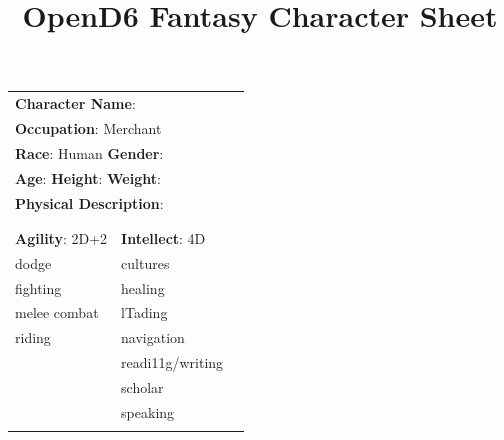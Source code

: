 \documentclass[10pt]{article}
\title{OpenD6 Fantasy Character Sheet}
\begin{document}
\pagestyle{fancy}
\fancyhf{}
\fancyfoot[R]{\thepage}
\renewcommand{\headrulewidth}{0pt}


\cleardoublepage
\begin{table}
\begin{tabular}{m{156pt} m{156pt} m{156pt}}
    \multicolumn{2}{l}{\textbf{Character Name}:  \hrulefill} \\
    \multicolumn{2}{l}{\textbf{Occupation}: Merchant \hrulefill} \\
    \multicolumn{2}{l}{\textbf{Race}: Human \hrulefill \hspace{1em} \textbf{Gender}:  \hrulefill} \\
    \multicolumn{2}{l}{\textbf{Age}:  \hrulefill \hspace{1em} \textbf{Height}:  \hrulefill \hspace{1em}  \textbf{Weight}:  \hrulefill } \\
    \multicolumn{2}{l}{\textbf{Physical Description}:  \hrulefill } \\
    \multicolumn{2}{l}{ \hrulefill } \\
 & & \\
\textbf{Agility}: 2D+2 \hrulefill      & \textbf{Intellect}: 4D \hrulefill  &                             \\

dodge                \hrulefill & cultures             \hrulefill & \\

fighting             \hrulefill & healing              \hrulefill & \\

melee combat         \hrulefill & lTading              \hrulefill & \\

riding               \hrulefill & navigation           \hrulefill & \\

 \hrulefill & readi11g/writing     \hrulefill & \\

 \hrulefill & scholar              \hrulefill & \\

 \hrulefill & speaking             \hrulefill & \\

 \hrulefill &  \hrulefill & \\


\end{tabular}
\end{table}
\end{document}
